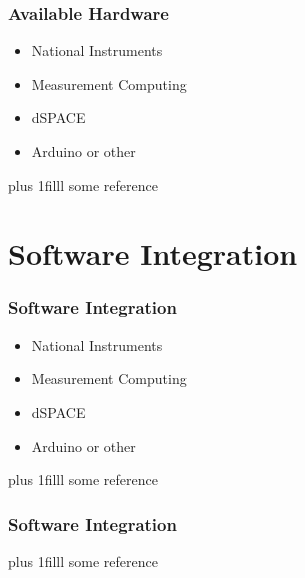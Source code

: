 \documentclass[fleqn]{beamer} %
\newcommand{\sectiontitleIII}{Available Hardware}
\newcommand{\sectiontitleIV}{Software Integration}
\newcommand{\btVFill}{\vskip0pt plus 1filll}
\begin{document}
\begin{frame}[label=sectionIII] \small
\frametitle{\sectiontitleIII}
\bigskip

\begin{itemize}
	\item National Instruments \vspace{6mm}\\
	
	\item Measurement Computing  \vspace{6mm}\\
	
	\item dSPACE  \vspace{6mm}\\
	
	\item Arduino or other 
	
\end{itemize}

\btVFill
\tiny{some reference}		

\end{frame}
	
\section{\sectiontitleIV}	

\begin{frame}[label=sectionIV] \small
\frametitle{\sectiontitleIV}
\bigskip

\begin{itemize}
	\item National Instruments \vspace{6mm}\\
	
	\item Measurement Computing  \vspace{6mm}\\
	
	\item dSPACE  \vspace{6mm}\\
	
	\item Arduino or other 
	
\end{itemize}


\btVFill
\tiny{some reference}		

\end{frame}

\begin{frame}[label=sectionIV] \small
\frametitle{\sectiontitleIV}
\bigskip


\btVFill
\tiny{some reference}	
\end{frame}
\end{document}
